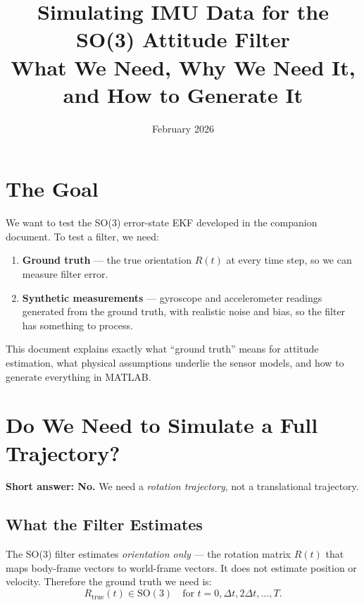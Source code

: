 \documentclass[11pt,letterpaper]{article}
\title{\textbf{Simulating IMU Data for the SO(3) Attitude Filter}\\[8pt]
\large What We Need, Why We Need It, and How to Generate It}
\author{}
\date{February 2026}
\newcommand{\SO}{\mathrm{SO}(3)}
\begin{document}
\maketitle
\thispagestyle{fancy}

\tableofcontents
\newpage

\section{The Goal}

We want to test the SO(3) error-state EKF developed in the companion
document.  To test a filter, we need:

\begin{enumerate}[nosep]
  \item \textbf{Ground truth} --- the true orientation $R(t)$ at
    every time step, so we can measure filter error.
  \item \textbf{Synthetic measurements} --- gyroscope and
    accelerometer readings generated from the ground truth, with
    realistic noise and bias, so the filter has something to
    process.
\end{enumerate}

This document explains exactly what ``ground truth'' means for
attitude estimation, what physical assumptions underlie the sensor
models, and how to generate everything in MATLAB.

\section{Do We Need to Simulate a Full Trajectory?}

\textbf{Short answer: No.}  We need a \emph{rotation trajectory},
not a translational trajectory.

\subsection{What the Filter Estimates}

The SO(3) filter estimates \emph{orientation only} --- the rotation
matrix $R(t)$ that maps body-frame vectors to world-frame vectors.
It does not estimate position or velocity.  Therefore the ground
truth we need is:
\[
  R_{\mathrm{true}}(t) \in \SO \quad \text{for } t = 0, \Delta t, 2\Delta t, \ldots, T.
\]
\end{document}
